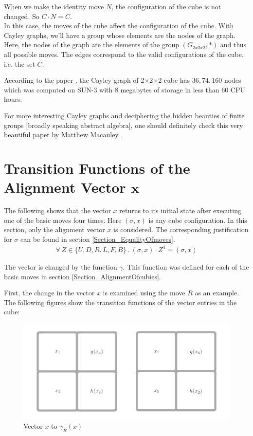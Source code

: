 \documentclass[12pt,a4paper]{article}
\theoremstyle{custom}
\newcommand{\Ttwo}{2$\times$2$\times$2-}
\begin{document}
When we make the identity move $N$, the configuration of the cube is not changed. So $C \cdot N = C$. 
\\
In this case, the moves of the cube affect the configuration of the cube. 
With Cayley graphs,  we'll have a group whose elements are the nodes of the graph. Here, the nodes of the graph are the elements of the group $(G_{2x2x2}, \scriptstyle*)$ and thus all possible moves. The edges correspond to the valid configurations of the cube, i.e. the set $C$. 

According to the paper \cite{cayleyrubik}, the Cayley graph of \Ttwo cube has $36, 74,160$ nodes which was computed on SUN-3 with 8 megabytes of storage in less than 60 CPU hours.





For more interesting Cayley graphs and deciphering the hidden beauties of finite groups [broadly speaking abstract algebra], one should definitely check this very beautiful paper by Matthew Macauley \cite{macauley2024revealing}. 

\newpage
\section{Transition Functions of the Alignment Vector $\pmb{x}$}

\label{Appendix_AlignmentFunctions}

The following shows that the vector $x$ returns to its initial state after executing one of the basic moves four times. Here $(\sigma, x)$ is any cube configuration. In this section, only the alignment vector $x$ is considered. The corresponding justification for $\sigma$ can be found in section \ref{Section_EqualityOfmoves}.
\begin{align*}
\forall \ Z \in \{U, D, R, L, F, B\} \ . \ (\sigma, x) \cdot Z^4 = (\sigma, x)
\end{align*}


The vector is changed by the function $\gamma$. This function was defined for each of the basic moves in section \ref{Section_AlignmentOfcubies}.

First, the change in the vector $x$ is examined using the move $R$ as an example. The following figures show the transition functions of the vector entries in the cube:
\begin{figure}[H]
\centering
\includegraphics[scale=0.155]{Rhoch1.jpg}
\caption{Vector $x$ to $\gamma_R(x)$}
\end{figure}
\end{document}
